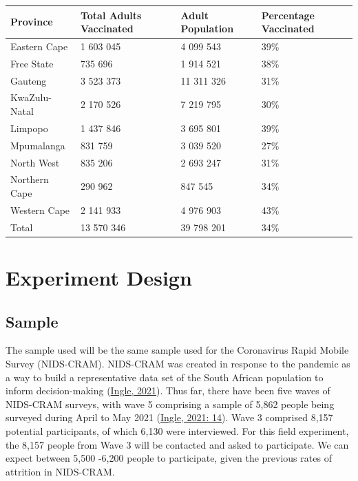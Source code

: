 \documentclass[11pt,preprint, authoryear]{elsarticle}
\let\origtable\table
\let\endorigtable\endtable
\renewenvironment{table}[1][2] {
    \expandafter\origtable\expandafter[H]
} {
    \endorigtable
}
\numberwithin{equation}{section}
\numberwithin{figure}{section}
\numberwithin{table}{section}
\begin{document}
\begin{table}[H]
\centering
\begin{tabular}{llll}
  \toprule
Province & Total Adults Vaccinated & Adult Population & Percentage Vaccinated \\ 
  \midrule
Eastern Cape & 1 603 045 & 4 099 543 & 39\% \\ 
  Free State & 735 696 & 1 914 521 & 38\% \\ 
  Gauteng & 3 523 373 & 11 311 326 & 31\% \\ 
  KwaZulu-Natal & 2 170 526 & 7 219 795 & 30\% \\ 
  Limpopo & 1 437 846 & 3 695 801 & 39\% \\ 
  Mpumalanga & 831 759 & 3 039 520 & 27\% \\ 
  North West & 835 206 & 2 693 247 & 31\% \\ 
  Northern Cape & 290 962 & 847 545 & 34\% \\ 
  Western Cape & 2 141 933 & 4 976 903 & 43\% \\ 
  Total & 13 570 346 & 39 798 201 & 34\% \\ 
   \bottomrule
\end{tabular}
\caption{Vaccination Statistics \label{tab1}} 
\end{table}

\hypertarget{experiment-design}{%
\section{\texorpdfstring{Experiment Design
\label{design}}{Experiment Design }}\label{experiment-design}}

\hypertarget{sample}{%
\subsection{Sample}\label{sample}}

The sample used will be the same sample used for the Coronavirus Rapid
Mobile Survey (NIDS-CRAM). NIDS-CRAM was created in response to the
pandemic as a way to build a representative data set of the South
African population to inform decision-making
(\protect\hyperlink{ref-nids}{Ingle, 2021}). Thus far, there have been
five waves of NIDS-CRAM surveys, with wave 5 comprising a sample of
5,862 people being surveyed during April to May 2021
(\protect\hyperlink{ref-nids}{Ingle, 2021: 14}). Wave 3 comprised 8,157
potential participants, of which 6,130 were interviewed. For this field
experiment, the 8,157 people from Wave 3 will be contacted and asked to
participate. We can expect between 5,500 -6,200 people to participate,
given the previous rates of attrition in NIDS-CRAM.
\end{document}
